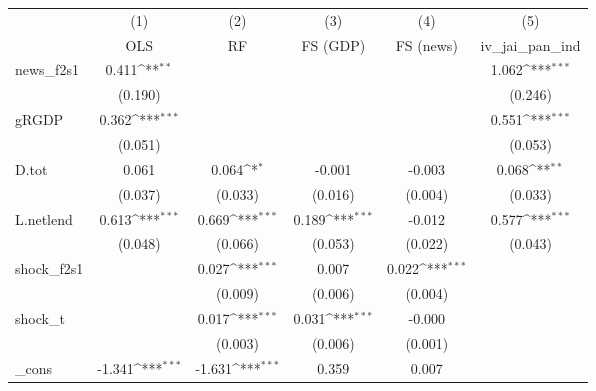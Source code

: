 {
\def\sym#1{\ifmmode^{#1}\else\(^{#1}\)\fi}
\begin{tabular}{l*{5}{c}}
\toprule
            &\multicolumn{1}{c}{(1)}&\multicolumn{1}{c}{(2)}&\multicolumn{1}{c}{(3)}&\multicolumn{1}{c}{(4)}&\multicolumn{1}{c}{(5)}\\
            &\multicolumn{1}{c}{OLS}&\multicolumn{1}{c}{RF}&\multicolumn{1}{c}{FS (GDP)}&\multicolumn{1}{c}{FS (news)}&\multicolumn{1}{c}{iv\_jai\_pan\_ind}\\
\midrule
news\_f2s1   &       0.411\sym{**} &                     &                     &                     &       1.062\sym{***}\\
            &     (0.190)         &                     &                     &                     &     (0.246)         \\
\addlinespace
gRGDP       &       0.362\sym{***}&                     &                     &                     &       0.551\sym{***}\\
            &     (0.051)         &                     &                     &                     &     (0.053)         \\
\addlinespace
D.tot       &       0.061         &       0.064\sym{*}  &      -0.001         &      -0.003         &       0.068\sym{**} \\
            &     (0.037)         &     (0.033)         &     (0.016)         &     (0.004)         &     (0.033)         \\
\addlinespace
L.netlend   &       0.613\sym{***}&       0.669\sym{***}&       0.189\sym{***}&      -0.012         &       0.577\sym{***}\\
            &     (0.048)         &     (0.066)         &     (0.053)         &     (0.022)         &     (0.043)         \\
\addlinespace
shock\_f2s1  &                     &       0.027\sym{***}&       0.007         &       0.022\sym{***}&                     \\
            &                     &     (0.009)         &     (0.006)         &     (0.004)         &                     \\
\addlinespace
shock\_t     &                     &       0.017\sym{***}&       0.031\sym{***}&      -0.000         &                     \\
            &                     &     (0.003)         &     (0.006)         &     (0.001)         &                     \\
\addlinespace
\_cons      &      -1.341\sym{***}&      -1.631\sym{***}&       0.359         &       0.007         &                     \\

\end{tabular}}
